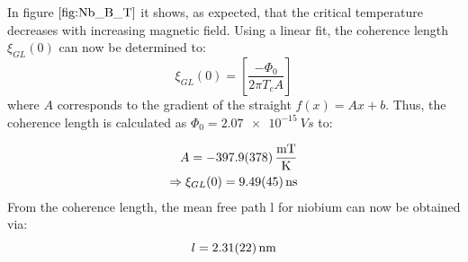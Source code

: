 In figure $\autoref{fig:Nb_B_T}$ it shows, as expected, that the critical temperature decreases with increasing magnetic field. Using a linear fit, the coherence length $\xi_{GL}(0)$ can now be determined to:
\begin{equation}
    \xi_{GL}(0)= \left[ \frac{-\Phi_0}{2\pi T_cA} \right]
\end{equation}
where $A$ corresponds to the gradient of the straight $f(x) = Ax+b$.  Thus, the coherence length is calculated as $\Phi_0 = \SI{2.07e-15}{Vs} $ to:

\begin{align*}
    A = \SI{-397,9\pm37,8 }{\frac{mT}{K}} \\
    \Rightarrow \xi_{GL}(0)= \SI{9,49\pm0,45}{ns} \\
\end{align*}
From the coherence length, the mean free path l for niobium can now be obtained via:
\begin{equation}
    l = \SI{2,31\pm0,22}{nm}
\end{equation}